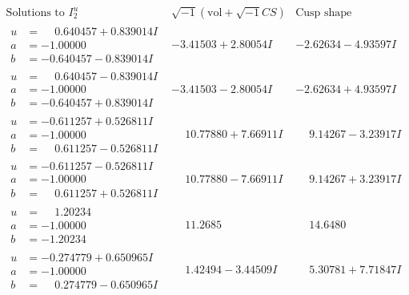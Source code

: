 \documentclass[1p]{elsarticle_modified}
\theoremstyle{definition}
\newcommand{\I}{\sqrt{-1}}
\begin{document}
$$\begin{array}{c|c|c}  
\text{Solutions to }I^u_{2}& \I (\text{vol} + \sqrt{-1}CS) & \text{Cusp shape}\\
 \hline 
\begin{aligned}
u &= \phantom{-}0.640457 + 0.839014 I \\
a &= -1.00000\phantom{ +0.000000I} \\
b &= -0.640457 - 0.839014 I\end{aligned}
 & -3.41503 + 2.80054 I & -2.62634 - 4.93597 I \\ \hline\begin{aligned}
u &= \phantom{-}0.640457 - 0.839014 I \\
a &= -1.00000\phantom{ +0.000000I} \\
b &= -0.640457 + 0.839014 I\end{aligned}
 & -3.41503 - 2.80054 I & -2.62634 + 4.93597 I \\ \hline\begin{aligned}
u &= -0.611257 + 0.526811 I \\
a &= -1.00000\phantom{ +0.000000I} \\
b &= \phantom{-}0.611257 - 0.526811 I\end{aligned}
 & \phantom{-}10.77880 + 7.66911 I & \phantom{-}9.14267 - 3.23917 I \\ \hline\begin{aligned}
u &= -0.611257 - 0.526811 I \\
a &= -1.00000\phantom{ +0.000000I} \\
b &= \phantom{-}0.611257 + 0.526811 I\end{aligned}
 & \phantom{-}10.77880 - 7.66911 I & \phantom{-}9.14267 + 3.23917 I \\ \hline\begin{aligned}
u &= \phantom{-}1.20234\phantom{ +0.000000I} \\
a &= -1.00000\phantom{ +0.000000I} \\
b &= -1.20234\phantom{ +0.000000I}\end{aligned}
 & \phantom{-}11.2685\phantom{ +0.000000I} & \phantom{-}14.6480\phantom{ +0.000000I} \\ \hline\begin{aligned}
u &= -0.274779 + 0.650965 I \\
a &= -1.00000\phantom{ +0.000000I} \\
b &= \phantom{-}0.274779 - 0.650965 I\end{aligned}
 & \phantom{-}1.42494 - 3.44509 I & \phantom{-}5.30781 + 7.71847 I \\ \hline\begin{aligned}

\end{aligned}
\end{array}$$
\end{document}
